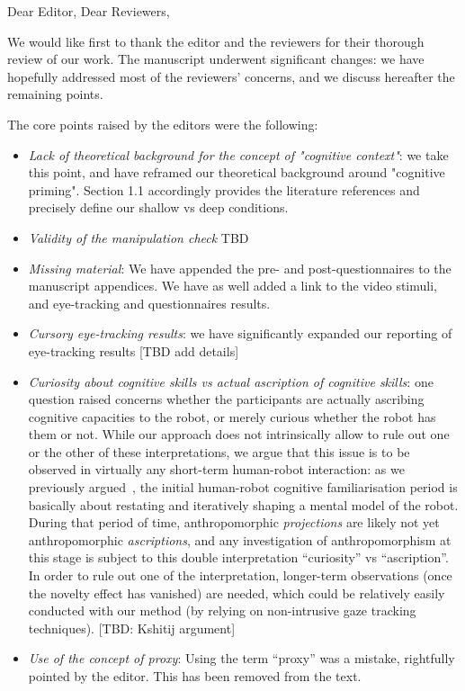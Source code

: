 \documentclass{article}
\begin{document}
Dear Editor, Dear Reviewers,

\vspace{2em}

We would like first to thank the editor and the reviewers for their thorough review of our
work. The manuscript underwent significant changes: we have hopefully addressed most of
the reviewers' concerns, and we discuss hereafter the remaining points.

The core points raised by the editors were the following:

\begin{itemize}
    \item \emph{Lack of theoretical background for the concept of "cognitive
        context"}: we take this point, and have reframed our theoretical
        background around "cognitive priming". Section 1.1 accordingly provides
        the literature references and precisely define our shallow vs deep
        conditions.
    \item \emph{Validity of the manipulation check} TBD
    \item \emph{Missing material}: We have appended the pre- and
        post-questionnaires to the manuscript appendices. We have as well added
        a link to the video stimuli, and eye-tracking and questionnaires
        results.
    \item \emph{Cursory eye-tracking results}: we have significantly expanded
        our reporting of eye-tracking results [TBD add details]
    \item \emph{Curiosity about cognitive skills vs actual ascription of cognitive
        skills}: one question raised concerns whether the participants are
        actually ascribing cognitive capacities to the robot, or merely curious
        whether the robot has them or not. While our approach does not
        intrinsically allow to rule out one or the other of these
        interpretations, we argue that this issue is to be observed in virtually
        any short-term human-robot interaction: as we previously
        argued~\cite{lemaignan2014cognitive}, the initial human-robot cognitive
        familiarisation period is basically about restating and iteratively
        shaping a mental model of the robot. During that period of time,
        anthropomorphic \emph{projections} are likely not yet anthropomorphic
        \emph{ascriptions}, and any investigation of anthropomorphism at this
        stage is subject to this double interpretation ``curiosity'' vs
        ``ascription''. In order to rule out one of the interpretation,
        longer-term observations (once the novelty effect has vanished) are
        needed, which could be relatively easily conducted with our method (by
        relying on non-intrusive gaze tracking techniques). [TBD: Kshitij
        argument]
    \item \emph{Use of the concept of proxy}: Using the term ``proxy'' was a
        mistake, rightfully pointed by the editor. This has been removed from
        the text.

\end{itemize}
\end{document}
